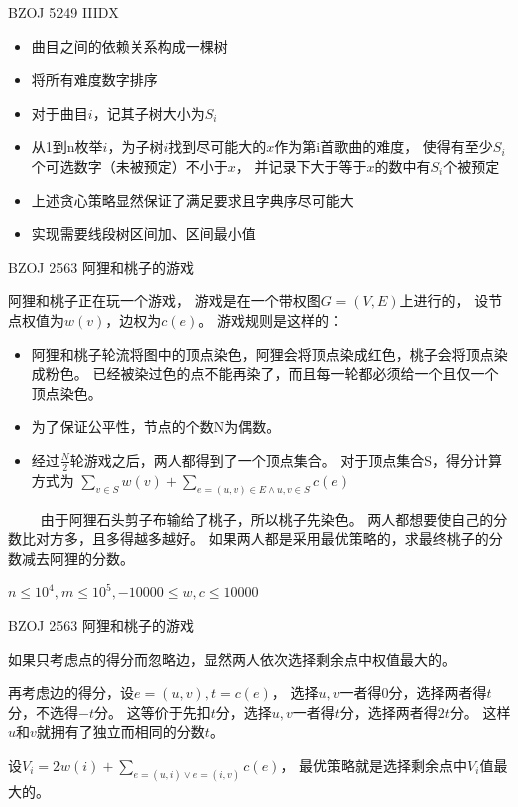 \documentclass{beamer}
\begin{document}
\begin{frame}{BZOJ 5249 IIIDX}

    \begin{itemize}
        \item 曲目之间的依赖关系构成一棵树
        \item 将所有难度数字排序
        \item 对于曲目$i$，记其子树大小为$S_i$
        \item 
            从1到n枚举$i$，为子树$i$找到尽可能大的$x$作为第i首歌曲的难度，
            使得有至少$S_i$个可选数字（未被预定）不小于$x$，
            并记录下大于等于$x$的数中有$S_i$个被预定
        \item 
            上述贪心策略显然保证了满足要求且字典序尽可能大
        \item
            实现需要线段树区间加、区间最小值
    \end{itemize}
    
\end{frame}

\begin{frame}{BZOJ 2563 阿狸和桃子的游戏}
    
    阿狸和桃子正在玩一个游戏，
    游戏是在一个带权图$G=(V, E)$上进行的，
    设节点权值为$w(v)$，边权为$c(e)$。
    游戏规则是这样的：

    \begin{itemize}
        \item 
            阿狸和桃子轮流将图中的顶点染色，阿狸会将顶点染成红色，桃子会将顶点染成粉色。
            已经被染过色的点不能再染了，而且每一轮都必须给一个且仅一个顶点染色。
        \item 为了保证公平性，节点的个数N为偶数。
    　　\item 
            经过$\frac{N}{2}$轮游戏之后，两人都得到了一个顶点集合。
            对于顶点集合S，得分计算方式为
            $\sum_{v\in S}w(v)+\sum_{e=(u,v)\in E \wedge u,v\in S}c(e)$
    \end{itemize}
    　　
    由于阿狸石头剪子布输给了桃子，所以桃子先染色。
    两人都想要使自己的分数比对方多，且多得越多越好。
    如果两人都是采用最优策略的，求最终桃子的分数减去阿狸的分数。

    $n\leq 10^4,m\leq 10^5, -10000\leq w,c\leq 10000$

\end{frame}

\begin{frame}{BZOJ 2563 阿狸和桃子的游戏}

    
    如果只考虑点的得分而忽略边，显然两人依次选择剩余点中权值最大的。

    再考虑边的得分，设$e=(u,v),t=c(e)$，
    选择$u,v$一者得$0$分，选择两者得$t$分，不选得$-t$分。
    这等价于先扣$t$分，选择$u,v$一者得$t$分，选择两者得$2t$分。
    这样$u$和$v$就拥有了独立而相同的分数$t$。

    设$V_i=2w(i)+\sum_{e=(u,i)\vee e=(i,v)}c(e)$，
    最优策略就是选择剩余点中$V_i$值最大的。

\end{frame}
\end{document}
